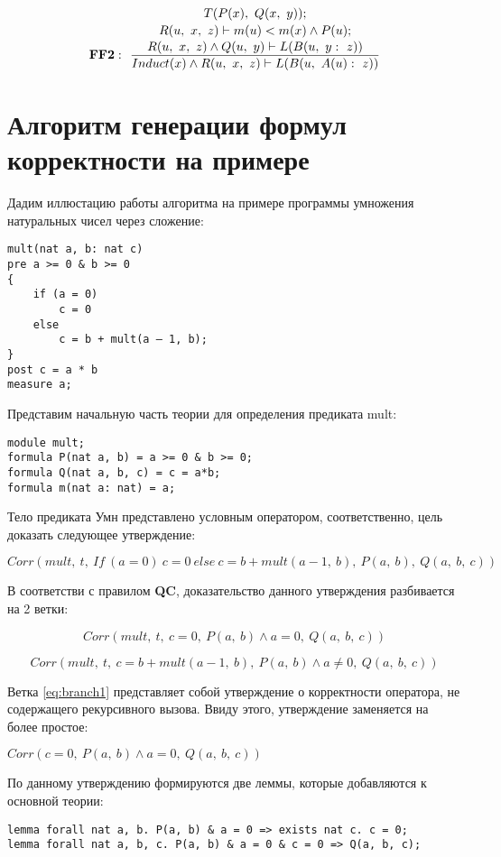 \documentclass[10pt,a4paper]{article}
\newcommand{\ruleI}[3] {
$$
\mathbf{#1:} ~~
\frac{#2}{#3}
$$
}
\newcommand{\ruleII}[4] {
\ruleI{#1}
{\genfrac{}{}{0pt}{0}{#2}{#3}}
{#4}
}
\newcommand{\ruleIII}[5] {
\ruleII{#1}
{\genfrac{}{}{0pt}{0}{#2}{#3}}
{#4}
{#5}
}
\newcommand{\numformula}[2] {
\begin{equation}
\label{eq:#1}
#2
\end{equation}
}
\newcommand{\lnkformula}[1] {
\eqref{eq:#1}
}
\begin{document}
\ruleIII{FF2}
{T(P(x),~Q(x,~y));}
{R(u,~x,~z) \vdash m(u)<m(x) \land P(u);}
{R(u,~x,~z) \land Q(u,~y) \vdash L(B(u,~y:~z))}
{Induct(x) \land R(u,~x,~z) \vdash L(B(u,~A(u):~z))}

\section{Алгоритм генерации формул корректности на примере}

Дадим иллюстацию работы алгоритма на примере программы умножения натуральных чисел через сложение:

\begin{lstlisting}
mult(nat a, b: nat c)
pre a >= 0 & b >= 0
{
    if (a = 0)
        c = 0
    else
        c = b + mult(a – 1, b);
}
post c = a * b
measure a;
\end{lstlisting}

Представим начальную часть теории для определения предиката mult:

\begin{lstlisting}
module mult;
formula P(nat a, b) = a >= 0 & b >= 0;
formula Q(nat a, b, c) = c = a*b;
formula m(nat a: nat) = a;
\end{lstlisting}

Тело предиката Умн представлено условным оператором, соответственно, цель доказать следующее утверждение:

\begin{center}
$ Corr(mult,~t,~If~(a=0)~c=0~else~c=b+mult(a-1,~b),~P(a,~b),~Q(a,~b,~c)) $
\end{center}

В соответстви с правилом \textbf{QC}, доказательство данного утверждения разбивается на 2 ветки:

\numformula{branch1}
{Corr(mult,~t,~c=0,~P(a,~b) \land a=0,~Q(a,~b,~c))}
\numformula{branch2}
{Corr(mult,~t,~c=b+mult(a-1,~b),~P(a,~b) \land a\ne0,~Q(a,~b,~c))}

Ветка \lnkformula{branch1} представляет собой утверждение о корректности оператора, не содержащего рекурсивного вызова. Ввиду этого, утверждение заменяется на более простое:

\begin{center}
$ Corr(c=0,~P(a,~b) \land a=0,~Q(a,~b,~c)) $
\end{center}

По данному утверждению формируются две леммы, которые добавляются к основной теории:

\begin{lstlisting}
lemma forall nat a, b. P(a, b) & a = 0 => exists nat c. c = 0;
lemma forall nat a, b, c. P(a, b) & a = 0 & c = 0 => Q(a, b, c);
\end{lstlisting}
\end{document}
